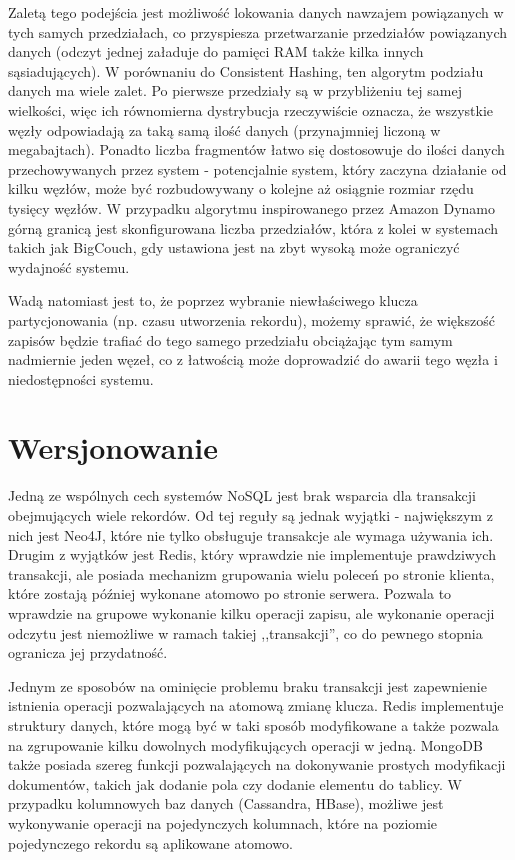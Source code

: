 Zaletą tego podejścia jest możliwość lokowania danych nawzajem powiązanych w tych samych przedziałach, co przyspiesza przetwarzanie przedziałów powiązanych danych (odczyt jednej załaduje do pamięci RAM także kilka innych sąsiadujących).
W porównaniu do Consistent Hashing, ten algorytm podziału danych ma wiele zalet.
Po pierwsze przedziały są w przybliżeniu tej samej wielkości, więc ich równomierna dystrybucja rzeczywiście oznacza, że wszystkie węzły odpowiadają za taką samą ilość danych (przynajmniej liczoną w megabajtach).
Ponadto liczba fragmentów łatwo się dostosowuje do ilości danych przechowywanych przez system - potencjalnie system, który zaczyna działanie od kilku węzłów, może być rozbudowywany o kolejne aż osiągnie rozmiar rzędu tysięcy węzłów.
W przypadku algorytmu inspirowanego przez Amazon Dynamo górną granicą jest skonfigurowana liczba przedziałów, która z kolei w systemach takich jak BigCouch, gdy ustawiona jest na zbyt wysoką może ograniczyć wydajność systemu.

Wadą natomiast jest to, że poprzez wybranie niewłaściwego klucza partycjonowania (np. czasu utworzenia rekordu), możemy sprawić, że większość zapisów będzie trafiać do tego samego przedziału obciążając tym samym nadmiernie jeden węzeł, co z łatwością może doprowadzić do awarii tego węzła i niedostępności systemu.

\section{Wersjonowanie}

Jedną ze wspólnych cech systemów NoSQL jest brak wsparcia dla transakcji obejmujących wiele rekordów.
Od tej reguły są jednak wyjątki - największym z nich jest Neo4J, które nie tylko obsługuje transakcje ale wymaga używania ich.
Drugim z wyjątków jest Redis, który wprawdzie nie implementuje prawdziwych transakcji, ale posiada mechanizm grupowania wielu poleceń po stronie klienta, które zostają później wykonane atomowo po stronie serwera.
Pozwala to wprawdzie na grupowe wykonanie kilku operacji zapisu, ale wykonanie operacji odczytu jest niemożliwe w ramach takiej ,,transakcji'', co do pewnego stopnia ogranicza jej przydatność.

Jednym ze sposobów na ominięcie problemu braku transakcji jest zapewnienie istnienia operacji pozwalających na atomową zmianę klucza.
Redis implementuje struktury danych, które mogą być w taki sposób modyfikowane a także pozwala na zgrupowanie kilku dowolnych modyfikujących operacji w jedną.
MongoDB także posiada szereg funkcji pozwalających na dokonywanie prostych modyfikacji dokumentów, takich jak dodanie pola czy dodanie elementu do tablicy.
W przypadku kolumnowych baz danych (Cassandra, HBase), możliwe jest wykonywanie operacji na pojedynczych kolumnach, które na poziomie pojedynczego rekordu są aplikowane atomowo.

